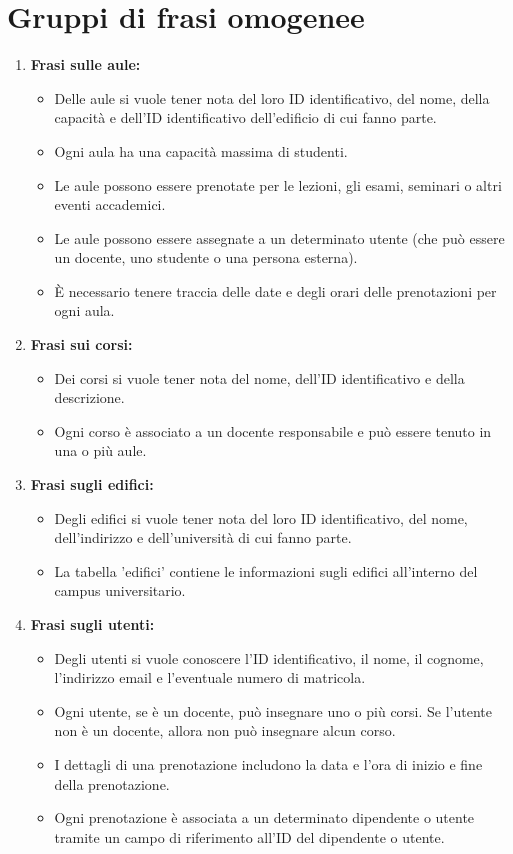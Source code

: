 \documentclass[a4paper, 10pt, oneside]{article} %
\begin{document}
\newpage
\section{Gruppi di frasi omogenee}

\begin{enumerate}
    \item \textbf{Frasi sulle aule:}
\begin{itemize}
    \item Delle aule si vuole tener nota del loro ID identificativo, del nome, della capacità e dell'ID identificativo dell'edificio di cui fanno parte.
    \item Ogni aula ha una capacità massima di studenti.
    \item Le aule possono essere prenotate per le lezioni, gli esami, seminari o altri eventi accademici.
    \item Le aule possono essere assegnate a un determinato utente (che può essere un docente, uno studente o una persona esterna).
    \item È necessario tenere traccia delle date e degli orari delle prenotazioni per ogni aula.


\end{itemize}

\item \textbf{Frasi sui corsi:}
\begin{itemize}
    \item Dei corsi si vuole tener nota del nome, dell'ID identificativo e della descrizione.
    \item Ogni corso è associato a un docente responsabile e può essere tenuto in una o più aule.
\end{itemize}

\item \textbf{Frasi sugli edifici:}

\begin{itemize}
    \item Degli edifici si vuole tener nota del loro ID identificativo, del nome, dell'indirizzo e dell'università di cui fanno parte.
    \item La tabella 'edifici' contiene le informazioni sugli edifici all'interno del campus universitario.
\end{itemize}


\item \textbf{Frasi sugli utenti:}

\begin{itemize}
    \item Degli utenti si vuole conoscere l'ID identificativo, il nome, il cognome, l'indirizzo email e l'eventuale numero di matricola.
    \item Ogni utente, se è un docente, può insegnare uno o più corsi. Se l'utente non è un docente, allora non può insegnare alcun corso.
    \item I dettagli di una prenotazione includono la data e l'ora di inizio e fine della prenotazione.
    \item Ogni prenotazione è associata a un determinato dipendente o utente tramite un campo di riferimento all'ID del dipendente o utente.
    

\end{itemize}
\end{enumerate}
\end{document}
